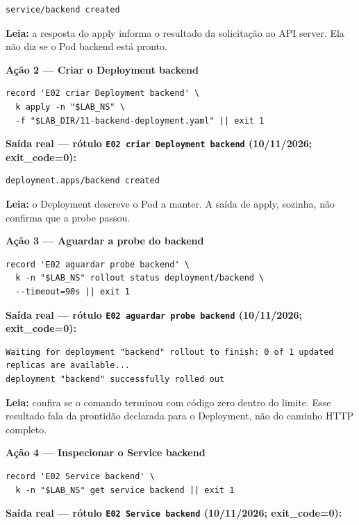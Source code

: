 \documentclass[12pt,openany,oneside,a4paper,chapter=TITLE,english,brazil]{abntex2}
\begin{document}
\begin{verbatim}
service/backend created
\end{verbatim}

\textbf{Leia:} a resposta do apply informa o resultado da solicitação ao API server. Ela não diz se o Pod backend está pronto.

\textbf{Ação 2 --- Criar o Deployment backend}

\begin{verbatim}
record 'E02 criar Deployment backend' \
  k apply -n "$LAB_NS" \
  -f "$LAB_DIR/11-backend-deployment.yaml" || exit 1
\end{verbatim}

\textbf{Saída real --- rótulo \texttt{E02 criar Deployment backend} (10/11/2026; exit\_code=0):}

\begin{verbatim}
deployment.apps/backend created
\end{verbatim}

\textbf{Leia:} o Deployment descreve o Pod a manter. A saída de apply, sozinha, não confirma que a probe passou.

\textbf{Ação 3 --- Aguardar a probe do backend}

\begin{verbatim}
record 'E02 aguardar probe backend' \
  k -n "$LAB_NS" rollout status deployment/backend \
  --timeout=90s || exit 1
\end{verbatim}

\textbf{Saída real --- rótulo \texttt{E02 aguardar probe backend} (10/11/2026; exit\_code=0):}

\begin{verbatim}
Waiting for deployment "backend" rollout to finish: 0 of 1 updated replicas are available...
deployment "backend" successfully rolled out
\end{verbatim}

\textbf{Leia:} confira se o comando terminou com código zero dentro do limite. Esse resultado fala da prontidão declarada para o Deployment, não do caminho HTTP completo.

\textbf{Ação 4 --- Inspecionar o Service backend}

\begin{verbatim}
record 'E02 Service backend' \
  k -n "$LAB_NS" get service backend || exit 1
\end{verbatim}

\textbf{Saída real --- rótulo \texttt{E02 Service backend} (10/11/2026; exit\_code=0):}
\end{document}
